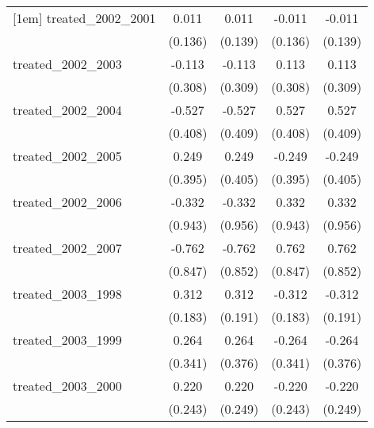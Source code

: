 {\begin{tabular}{l*{4}{c}}
[1em]
treated\_2002\_2001&       0.011         &       0.011         &      -0.011         &      -0.011         \\
            &     (0.136)         &     (0.139)         &     (0.136)         &     (0.139)         \\
[1em]
treated\_2002\_2003&      -0.113         &      -0.113         &       0.113         &       0.113         \\
            &     (0.308)         &     (0.309)         &     (0.308)         &     (0.309)         \\
[1em]
treated\_2002\_2004&      -0.527         &      -0.527         &       0.527         &       0.527         \\
            &     (0.408)         &     (0.409)         &     (0.408)         &     (0.409)         \\
[1em]
treated\_2002\_2005&       0.249         &       0.249         &      -0.249         &      -0.249         \\
            &     (0.395)         &     (0.405)         &     (0.395)         &     (0.405)         \\
[1em]
treated\_2002\_2006&      -0.332         &      -0.332         &       0.332         &       0.332         \\
            &     (0.943)         &     (0.956)         &     (0.943)         &     (0.956)         \\
[1em]
treated\_2002\_2007&      -0.762         &      -0.762         &       0.762         &       0.762         \\
            &     (0.847)         &     (0.852)         &     (0.847)         &     (0.852)         \\
[1em]
treated\_2003\_1998&       0.312         &       0.312         &      -0.312         &      -0.312         \\
            &     (0.183)         &     (0.191)         &     (0.183)         &     (0.191)         \\
[1em]
treated\_2003\_1999&       0.264         &       0.264         &      -0.264         &      -0.264         \\
            &     (0.341)         &     (0.376)         &     (0.341)         &     (0.376)         \\
[1em]
treated\_2003\_2000&       0.220         &       0.220         &      -0.220         &      -0.220         \\
            &     (0.243)         &     (0.249)         &     (0.243)         &     (0.249)         \\

\end{tabular}}
